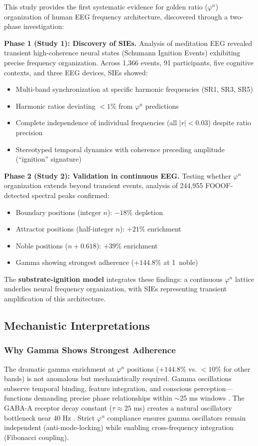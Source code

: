\documentclass[11pt,a4paper]{article}
\newcommand{\phisym}{\varphi}
\begin{document}
This study provides the first systematic evidence for golden ratio ($\phisym^n$) organization of human EEG frequency architecture, discovered through a two-phase investigation:

\textbf{Phase 1 (Study 1): Discovery of SIEs.} Analysis of meditation EEG revealed transient high-coherence neural states (Schumann Ignition Events) exhibiting precise frequency organization. Across 1,366 events, 91 participants, five cognitive contexts, and three EEG devices, SIEs showed:
\begin{itemize}
    \item Multi-band synchronization at specific harmonic frequencies (SR1, SR3, SR5)
    \item Harmonic ratios deviating $<1\%$ from $\phisym^n$ predictions
    \item Complete independence of individual frequencies (all $|r| < 0.03$) despite ratio precision
    \item Stereotyped temporal dynamics with coherence preceding amplitude (``ignition'' signature)
\end{itemize}

\textbf{Phase 2 (Study 2): Validation in continuous EEG.} Testing whether $\phisym^n$ organization extends beyond transient events, analysis of 244,955 FOOOF-detected spectral peaks confirmed:
\begin{itemize}
    \item Boundary positions (integer $n$): $-18\%$ depletion
    \item Attractor positions (half-integer $n$): $+21\%$ enrichment
    \item Noble positions ($n + 0.618$): $+39\%$ enrichment
    \item Gamma showing strongest adherence ($+144.8\%$ at 1\degree\ noble)
\end{itemize}

The \textbf{substrate-ignition model} integrates these findings: a continuous $\phisym^n$ lattice underlies neural frequency organization, with SIEs representing transient amplification of this architecture.

\subsection{Mechanistic Interpretations}

\subsubsection{Why Gamma Shows Strongest Adherence}
The dramatic gamma enrichment at $\phisym^n$ positions ($+144.8\%$ vs. $<10\%$ for other bands) is not anomalous but mechanistically required. Gamma oscillations subserve temporal binding, feature integration, and conscious perception---functions demanding precise phase relationships within $\sim$25 ms windows \parencite{canolty2010functional, lisman2013thetagamma}. The GABA-A receptor decay constant ($\tau \approx 25$ ms) creates a natural oscillatory bottleneck near 40 Hz \parencite{bartos2007synaptic}. Strict $\phisym^n$ compliance ensures gamma oscillators remain independent (anti-mode-locking) while enabling cross-frequency integration (Fibonacci coupling).
\end{document}
